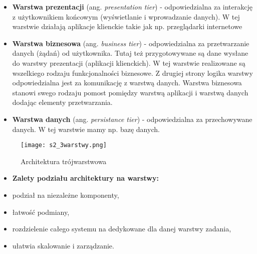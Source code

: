 \begin{itemize}
	\begin{itemize}
		\setlength\itemsep{1pt}
		\item \textbf{Warstwa prezentacji} (ang. \textit{presentation tier}) - odpowiedzialna za interakcję z użytkownikiem końcowym (wyświetlanie i wprowadzanie danych). W tej warstwie działają aplikacje klienckie takie jak np. przeglądarki internetowe 
		\item \textbf{Warstwa biznesowa} (ang. \textit{business tier}) - odpowiedzialna za przetwarzanie danych (żądań) od użytkownika.  Tutaj też przygotowywane są dane wysłane  do warstwy prezentacji (aplikacji klienckich). W tej warstwie realizowane są wszelkiego rodzaju funkcjonalności biznesowe. Z drugiej strony logika warstwy odpowiedzialna jest za komunikację z warstwą danych. Warstwa biznesowa stanowi swego rodzaju pomost pomiędzy warstwą aplikacji i warstwą danych dodając elementy przetwarzania.
		\item \textbf{Warstwa danych} (ang. \textit{persistance tier}) - odpowiedzialna za przechowywane danych. W tej warstwie mamy np. bazę danych.
	\end{itemize}

	\begin{figure}[H]
		\centering
		\texttt{[image: s2\_3warstwy.png]}
		\caption{Architektura trójwarstwowa}
	\end{figure}

\end{itemize}

\begin{itemize}
	\setlength\itemsep{1pt}
	\item[] \textbf{Zalety podziału architektury na warstwy:}
	\item podział na niezależne komponenty, 
	\item łatwość podmiany, 
	\item rozdzielenie całego systemu na dedykowane dla danej warstwy zadania, 
	\item ułatwia skalowanie i zarządzanie.
\end{itemize}